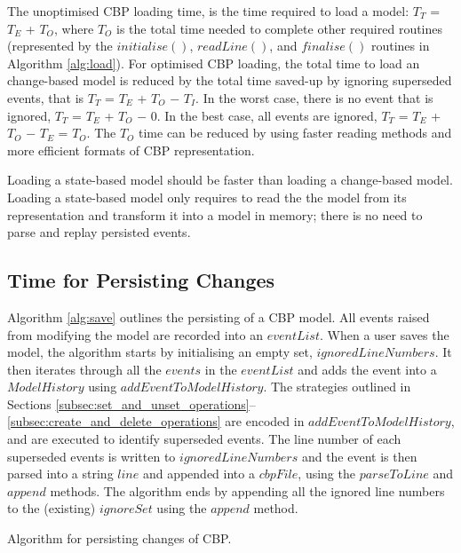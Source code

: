 \documentclass{llncs}
\begin{document}
    The unoptimised CBP loading time, is the time required to load a model: $T_T$ = $T_E$ + $T_O$, where $T_O$ is the total time needed to complete other required routines (represented by the $initialise()$, $readLine()$, and $finalise()$ routines in Algorithm \ref{alg:load}). For optimised CBP loading, the total time to load an change-based model is reduced by the total time saved-up by ignoring superseded events, that is $T_T$ = $T_E$ + $T_O$ $-$ $T_I$. In the worst case, there is no event that is ignored, $T_T$ = $T_E$ + $T_O$ $-$ 0. In the best case, all events are ignored, $T_T$ = $T_E$ + $T_O$ $-$ $T_E$ = $T_O$. The $T_O$ time can be reduced by using faster reading methods and more efficient formats of CBP representation. 
    
    Loading a state-based model should be faster than loading a change-based model. Loading a state-based model only requires to read the the model from its representation and transform it into a model in memory; there is no need to parse and replay persisted events.
    
    \subsection{Time for Persisting Changes}
    Algorithm \ref{alg:save} outlines the persisting of a CBP model. All events raised from modifying the model are recorded into an $eventList$. When a user saves the model, the algorithm starts by initialising an empty set, $ignoredLineNumbers$. It then iterates through all the $events$ in the $eventList$ and adds the event into a $ModelHistory$ using $addEventToModelHistory$.  The strategies outlined in Sections \ref{subsec:set_and_unset_operations}--\ref{subsec:create_and_delete_operations} are encoded in  $addEventToModelHistory$, and are executed to identify superseded events. The line number of each superseded events is written to  $ignoredLineNumbers$ and the event is then parsed into a string $line$ and appended into a $cbpFile$, using the $parseToLine$ and $append$ methods. The algorithm ends by appending all the ignored line numbers to the (existing) $ignoreSet$ using the $append$ method.
    
    \IncMargin{1.5em}
    \begin{algorithm}[H]
\begin{small}
\end{small}
\caption{Algorithm for persisting changes of CBP.}
\label{alg:save}
    \end{algorithm}
\DecMargin{1.5em}
    
\end{document}
